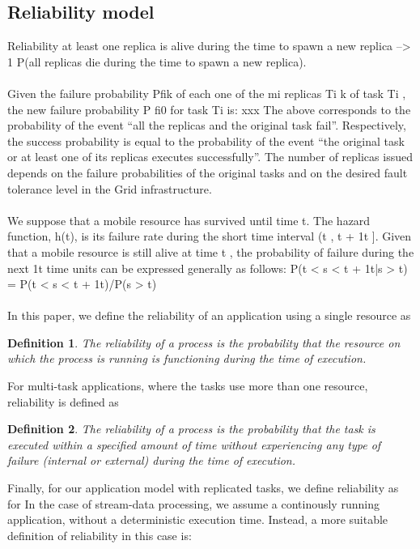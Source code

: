 \documentclass{cslthse-msc}
\newtheorem{definition}{Definition}[chapter]
\begin{document}
\subsection{Reliability model}
Reliability at least one replica is alive during the time to spawn a new replica --> 1 P(all replicas die during the time to spawn a new replica).
\\\\
Given the failure probability Pfik of each one of the mi replicas Ti k of task Ti , the new failure probability P fi0 for task Ti is: xxx
The above corresponds to the probability of the event “all the replicas and the original task fail”. Respectively, the success probability is equal to the probability of the event “the original task or at least one of its replicas executes successfully”. The number of replicas issued depends on the failure probabilities of the original tasks and on the desired fault tolerance level in the Grid infrastructure.  \cite{effTaskReplMobGrid}
\\\\
We suppose that a mobile resource has survived until time t. The hazard function, h(t), is its failure rate during the short time interval (t , t + 1t ]. Given that a mobile resource is still alive at time t , the probability of failure during the next 1t time units can be expressed generally as follows:
P(t < s < t + 1t|s > t) = P(t < s < t + 1t)/P(s > t) \cite{effTaskReplMobGrid}
\\\\
In this paper, we define the reliability of an application using a single resource as
\begin{definition} \label{def:simple_reliability}
The reliability of a process is the probability that the resource on which the process is running is functioning during the time of execution.
\end{definition}

For multi-task applications, where the tasks use more than one resource, reliability is defined as

\begin{definition} \label{def:dyn_reliability}
The reliability of a process is the probability that the task is executed within a specified amount of time without experiencing any type of failure (internal or external) during the time of execution.
\end{definition}

Finally, for our application model with replicated tasks, we define reliability as
for In the case of stream-data processing, we assume a continously running application, without a deterministic execution time. Instead, a more suitable definition of reliability in this case is:
\end{document}
